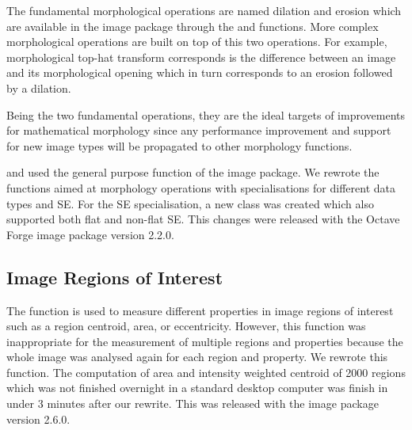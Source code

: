 The fundamental morphological operations are named dilation and
erosion which are available in the image package through the
 and  functions.  More complex
morphological operations are built on top of this two operations.  For
example, morphological top-hat transform corresponds is the difference
between an image and its morphological opening which in turn
corresponds to an erosion followed by a dilation.

Being the two fundamental operations, they are the ideal targets of
improvements for mathematical morphology since any performance
improvement and support for new image types will be propagated to
other morphology functions.


 and  used the general purpose
 function of the image package.
We rewrote the functions aimed at morphology operations with
specialisations for different data types and SE.  For the SE
specialisation, a new  class was created which also
supported both flat and non-flat SE.  This changes were released with
the Octave Forge image package version 2.2.0.


\subsection{Image Regions of Interest}

The function  is used to measure different
properties in image regions of interest such as a region centroid,
area, or eccentricity.  However, this function was inappropriate for
the measurement of multiple regions and properties because the whole
image was analysed again for each region and property.  We rewrote
this function.  The computation of area and intensity weighted
centroid of 2000 regions which was not finished overnight in a
standard desktop computer was finish in under 3 minutes after our
rewrite.  This was released with the image package version 2.6.0.

